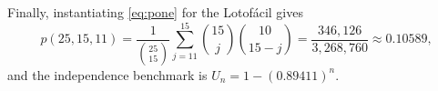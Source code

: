 Finally, instantiating \eqref{eq:pone} for the Lotof\'{a}cil gives
\begin{equation}
  \label{eq:pone-lotofacil}
  p(25,15,11)
  = \frac{1}{\binom{25}{15}}
    \sum_{j=11}^{15}
    \binom{15}{j}\binom{10}{15-j}
  = \frac{346{,}126}{3{,}268{,}760}
  \approx 0.10589,
\end{equation}
and the independence benchmark is $U_n = 1-(0.89411)^n$.
